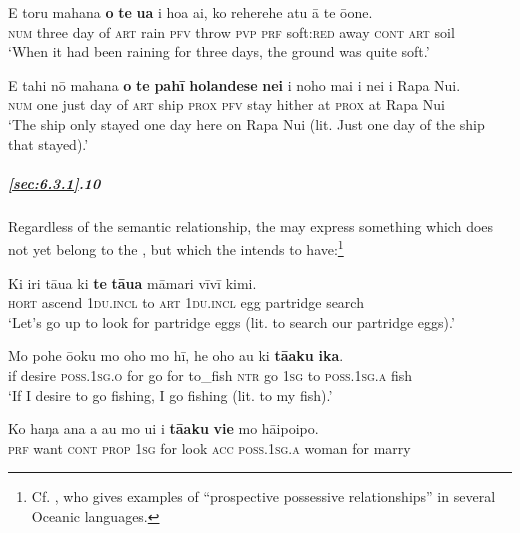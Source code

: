 \ea\label{ex:6.49}
\gll E toru mahana \textbf{o} \textbf{te} \textbf{{\ꞌ}ua} i hoa ai, ko reherehe atu {\ꞌ}ā te {\ꞌ}ō{\ꞌ}one. \\
\textsc{num} three day of \textsc{art} rain \textsc{pfv} throw \textsc{pvp} \textsc{prf} soft:\textsc{red} away \textsc{cont} \textsc{art} soil \\

\glt 
‘When it had been raining for three days, the ground was quite soft.’ \textstyleExampleref{[R378.040]} 
\z

\ea\label{ex:6.50}
\gll E tahi nō mahana \textbf{o} \textbf{te} \textbf{pahī} \textbf{holandese} \textbf{nei} i noho mai {\ꞌ}i nei  {\ꞌ}i Rapa Nui.\\
\textsc{num} one just day of \textsc{art} ship  \textsc{prox} \textsc{pfv} stay hither at \textsc{prox}  at Rapa Nui\\

\glt
‘The  ship only stayed one day here on Rapa Nui (lit. Just one day of the  ship that stayed).’ \textstyleExampleref{[R373.005]} 
\z

\subparagraph{\ref{sec:6.3.1}.10} Regardless of the semantic relationship, the  may express something which does not yet belong to the , but which the  intends to have:\footnote{\label{fn:291}Cf. \citet{Lichtenberk2002}, who gives examples of “prospective possessive relationships” in several Oceanic languages.}

\ea\label{ex:6.51}
\gll Ki iri tāua ki \textbf{te} \textbf{tāua} māmari vīvī kimi. \\
\textsc{hort} ascend \textsc{1du.incl} to \textsc{art} \textsc{1du.incl} egg partridge search \\

\glt 
‘Let’s go up to look for partridge eggs (lit. to search our partridge eggs).’ \textstyleExampleref{[R245.192]} 
\z

\ea\label{ex:6.52}
\gll Mo pohe ō{\ꞌ}oku mo oho mo hī, he oho au ki \textbf{tā{\ꞌ}aku} \textbf{ika}. \\
if desire \textsc{poss.1sg.o} for go for to\_fish \textsc{ntr} go \textsc{1sg} to \textsc{poss.1sg.a} fish \\

\glt 
‘If I desire to go fishing, I go fishing (lit. to my fish).’ \textstyleExampleref{[R647.061]} 
\z

\ea\label{ex:6.53}
\gll Ko haŋa {\ꞌ}ana a au mo u{\ꞌ}i i \textbf{tā{\ꞌ}aku} \textbf{vi{\ꞌ}e} mo hāipoipo. \\
\textsc{prf} want \textsc{cont} \textsc{prop} \textsc{1sg} for look \textsc{acc} \textsc{poss.1sg.a} woman for marry \\


